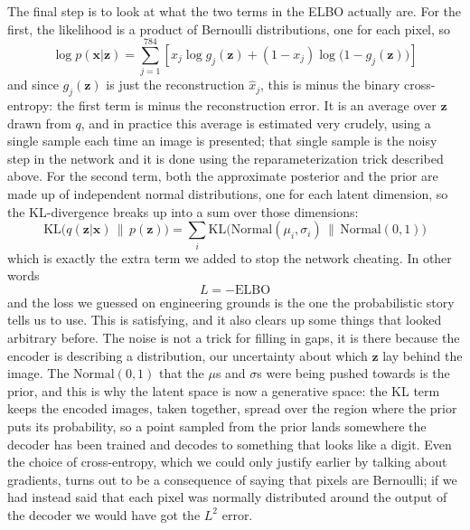 \documentclass[12pt]{article}
\begin{document}
The final step is to look at what the two terms in the ELBO actually
are. For the first, the likelihood is a product of Bernoulli
distributions, one for each pixel, so
\begin{equation}
  \log p(\mathbf{x}|\mathbf{z})=\sum_{j=1}^{784}\left[x_j\log g_j(\mathbf{z})+(1-x_j)\log\big(1-g_j(\mathbf{z})\big)\right]
\end{equation}
and since $g_j(\mathbf{z})$ is just the reconstruction $\hat{x}_j$,
this is minus the binary cross-entropy: the first term is minus the
reconstruction error. It is an average over $\mathbf{z}$ drawn from
$q$, and in practice this average is estimated very crudely, using a
single sample each time an image is presented; that single sample is
the noisy step in the network and it is done using the
reparameterization trick described above. For the second term, both
the approximate posterior and the prior are made up of independent
normal distributions, one for each latent dimension, so the
KL-divergence breaks up into a sum over those dimensions:
\begin{equation}
  \mathrm{KL}\big(q(\mathbf{z}|\mathbf{x})\,\|\,p(\mathbf{z})\big)=\sum_i\mathrm{KL}\big(\text{Normal}(\mu_i,\sigma_i)\,\|\,\text{Normal}(0,1)\big)
\end{equation}
which is exactly the extra term we added to stop the network
cheating. In other words
\begin{equation}
  L=-\text{ELBO}
\end{equation}
and the loss we guessed on engineering grounds is the one the
probabilistic story tells us to use. This is satisfying, and it also
clears up some things that looked arbitrary before. The noise is not a
trick for filling in gaps, it is there because the encoder is
describing a distribution, our uncertainty about which $\mathbf{z}$
lay behind the image. The $\text{Normal}(0,1)$ that the $\mu$s and
$\sigma$s were being pushed towards is the prior, and this is why the
latent space is now a generative space: the KL term keeps the encoded
images, taken together, spread over the region where the prior puts
its probability, so a point sampled from the prior lands somewhere the
decoder has been trained and decodes to something that looks like a
digit. Even the choice of cross-entropy, which we could only justify
earlier by talking about gradients, turns out to be a consequence of
saying that pixels are Bernoulli; if we had instead said that each
pixel was normally distributed around the output of the decoder we
would have got the $L^2$ error.
\end{document}
